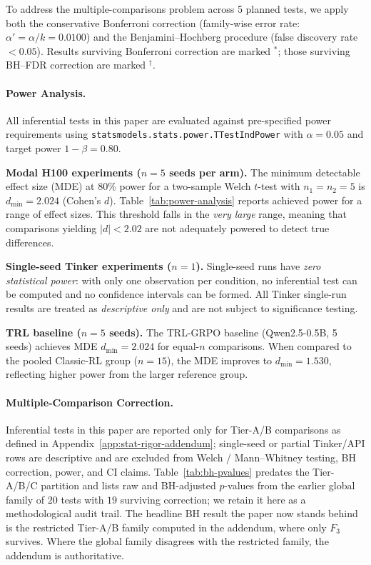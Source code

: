 \documentclass{article}
\begin{document}
To address the multiple-comparisons problem across 5 planned tests,
we apply both the conservative Bonferroni correction (family-wise error rate:
$\alpha' = \alpha / k = 0.0100$) and the Benjamini--Hochberg procedure
(false discovery rate $< 0.05$). Results surviving Bonferroni correction are
marked $^*$; those surviving BH--FDR correction are marked $^\dag$.

\paragraph{Power Analysis.}
All inferential tests in this paper are evaluated against pre-specified power
requirements using \texttt{statsmodels.stats.power.TTestIndPower} with
$\alpha = 0.05$ and target power $1 - \beta = 0.80$.

\textbf{Modal H100 experiments ($n = 5$ seeds per arm).}
The minimum detectable effect size (MDE) at 80\% power for a two-sample
Welch $t$-test with $n_1 = n_2 = 5$ is
$d_{\min} = 2.024$ (Cohen's $d$).
Table~\ref{tab:power-analysis} reports achieved power for a range of effect sizes.
This threshold falls in the \emph{very large} range, meaning that
comparisons yielding $|d| < 2.02$
are not adequately powered to detect true differences.

\textbf{Single-seed Tinker experiments ($n = 1$).}
Single-seed runs have \emph{zero statistical power}: with only one observation per
condition, no inferential test can be computed and no confidence intervals can be
formed.  All Tinker single-run results are treated as \emph{descriptive only} and
are not subject to significance testing.

\textbf{TRL baseline ($n = 5$ seeds).}
The TRL-GRPO baseline (Qwen2.5-0.5B, 5 seeds) achieves MDE
$d_{\min} = 2.024$ for equal-$n$ comparisons.
When compared to the pooled Classic-RL group ($n = 15$), the MDE
improves to $d_{\min} = 1.530$,
reflecting higher power from the larger reference group.

\paragraph{Multiple-Comparison Correction.}
Inferential tests in this paper are reported only for Tier-A/B
comparisons as defined in Appendix~\ref{app:stat-rigor-addendum};
single-seed or partial Tinker/API rows are descriptive and are
excluded from Welch / Mann--Whitney testing, BH correction, power,
and CI claims. Table~\ref{tab:bh-pvalues} predates the Tier-A/B/C
partition and lists raw and BH-adjusted $p$-values from the
earlier global family of $20$ tests with $19$ surviving correction;
we retain it here as a methodological audit trail. The headline
BH result the paper now stands behind is the restricted Tier-A/B
family computed in the addendum, where only $F_3$ survives. Where
the global family disagrees with the restricted family, the
addendum is authoritative.
\end{document}
